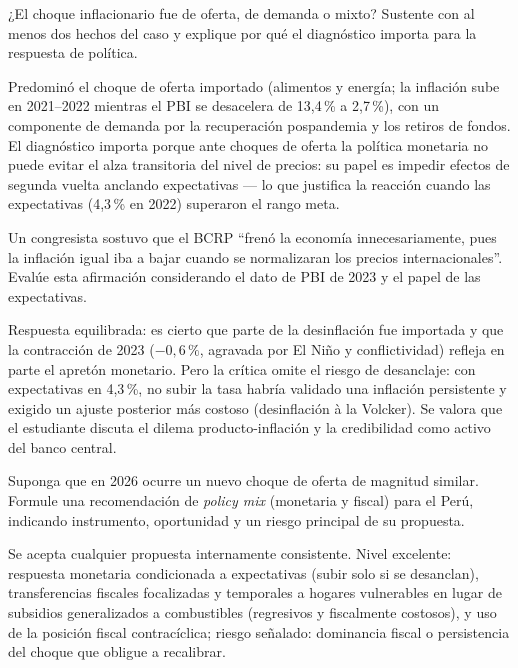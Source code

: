\documentclass{academic-exam}
\begin{document}
\begin{pregunta}[5][Diagnóstico]
¿El choque inflacionario fue de oferta, de demanda o mixto? Sustente con
al menos dos hechos del caso y explique por qué el diagnóstico importa
para la respuesta de política.
\begin{solucion}
Predominó el choque de oferta importado (alimentos y energía; la
inflación sube en 2021--2022 mientras el PBI se desacelera de 13,4\,\% a
2,7\,\%), con un componente de demanda por la recuperación pospandemia y
los retiros de fondos. El diagnóstico importa porque ante choques de
oferta la política monetaria no puede evitar el alza transitoria del
nivel de precios: su papel es impedir efectos de segunda vuelta anclando
expectativas — lo que justifica la reacción cuando las expectativas
(4,3\,\% en 2022) superaron el rango meta.
\end{solucion}
\end{pregunta}

\begin{pregunta}
Un congresista sostuvo que el BCRP \enquote{frenó la economía
innecesariamente, pues la inflación igual iba a bajar cuando se
normalizaran los precios internacionales}. Evalúe esta afirmación
considerando el dato de PBI de 2023 y el papel de las expectativas.
\begin{solucion}
Respuesta equilibrada: es cierto que parte de la desinflación fue
importada y que la contracción de 2023 ($-0{,}6\,\%$, agravada por El
Niño y conflictividad) refleja en parte el apretón monetario. Pero la
crítica omite el riesgo de desanclaje: con expectativas en 4,3\,\%, no
subir la tasa habría validado una inflación persistente y exigido un
ajuste posterior más costoso (desinflación à la Volcker). Se valora que
el estudiante discuta el dilema producto-inflación y la credibilidad
como activo del banco central.
\end{solucion}
\end{pregunta}

\begin{pregunta}[5][Propuesta]
Suponga que en 2026 ocurre un nuevo choque de oferta de magnitud similar.
Formule una recomendación de \emph{policy mix} (monetaria y fiscal) para
el Perú, indicando instrumento, oportunidad y un riesgo principal de su
propuesta.
\begin{solucion}
Se acepta cualquier propuesta internamente consistente. Nivel excelente:
respuesta monetaria condicionada a expectativas (subir solo si se
desanclan), transferencias fiscales focalizadas y temporales a hogares
vulnerables en lugar de subsidios generalizados a combustibles
(regresivos y fiscalmente costosos), y uso de la posición fiscal
contracíclica; riesgo señalado: dominancia fiscal o persistencia del
choque que obligue a recalibrar.
\end{solucion}
\end{pregunta}

\findelexamen
\end{document}
